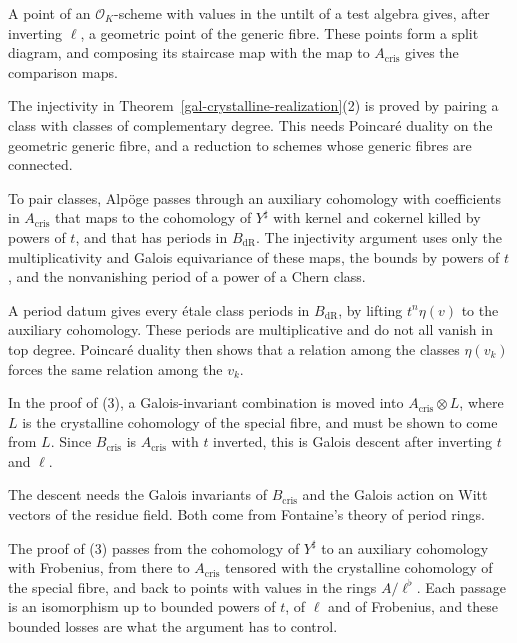 A point of an $\mathcal O_K$-scheme with values in the untilt of a test algebra gives, after inverting
$\ell$, a geometric point of the generic fibre. These points form a split diagram, and composing its
staircase map with the map to $A_{\mathrm{cris}}$ gives the comparison maps.

The injectivity in Theorem~\ref{gal-crystalline-realization}(2) is proved by pairing a class with classes
of complementary degree. This needs Poincar\'e duality on the geometric generic fibre, and a reduction to
schemes whose generic fibres are connected.

To pair classes, Alpöge passes through an auxiliary cohomology with coefficients in
$A_{\mathrm{cris}}$ that maps to the cohomology of $Y^\sharp$ with kernel and cokernel killed by powers of
$t$, and that has periods in $B_{\mathrm{dR}}$. The injectivity argument uses only the multiplicativity
and Galois equivariance of these maps, the bounds by powers of $t$, and the nonvanishing period of a
power of a Chern class.

A period datum gives every \'etale class periods in $B_{\mathrm{dR}}$, by lifting $t^n\eta(v)$ to the
auxiliary cohomology. These periods are multiplicative and do not all vanish in top degree. Poincar\'e
duality then shows that a relation among the classes $\eta(v_k)$ forces the same relation among the $v_k$.

In the proof of (3), a Galois-invariant combination is moved into $A_{\mathrm{cris}}\otimes L$, where $L$
is the crystalline cohomology of the special fibre, and must be shown to come from $L$. Since
$B_{\mathrm{cris}}$ is $A_{\mathrm{cris}}$ with $t$ inverted, this is Galois descent after inverting $t$
and $\ell$.

The descent needs the Galois invariants of $B_{\mathrm{cris}}$ and the Galois action on Witt vectors of
the residue field. Both come from Fontaine's theory of period rings.

The proof of (3) passes from the cohomology of $Y^\sharp$ to an auxiliary cohomology with Frobenius, from
there to $A_{\mathrm{cris}}$ tensored with the crystalline cohomology of the special fibre, and back to
points with values in the rings $A/\ell^\flat$. Each passage is an isomorphism up to bounded powers of
$t$, of $\ell$ and of Frobenius, and these bounded losses are what the argument has to control.

